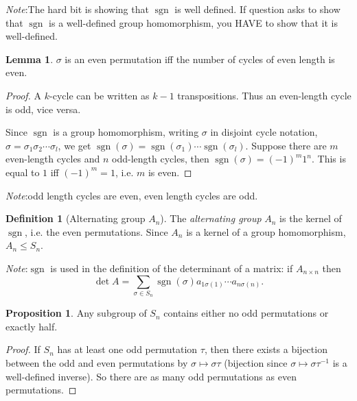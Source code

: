 \documentclass[a4paper]{article}
\theoremstyle{definition}
\newtheorem*{prop}{Proposition}
\newtheorem*{defi}{Definition}
\newtheorem*{lemma}{Lemma}
\newcommand{\note}{\noindent \emph{Note}:\;}
\DeclareMathOperator\sgn{sgn}
\begin{document}
\note The hard bit is showing that $\sgn$ is well defined. If question asks to show that $\sgn$ is a well-defined group homomorphism, you HAVE to show that it is well-defined.

\begin{lemma}
  $\sigma$ is an even permutation iff the number of cycles of even length is even.
\end{lemma}

\begin{proof}
  A $k$-cycle can be written as $k - 1$ transpositions. Thus an even-length cycle is odd, vice versa.

Since $\sgn$ is a group homomorphism, writing $\sigma$ in disjoint cycle notation, $\sigma = \sigma_1\sigma_2\cdots\sigma_l$, we get $\sgn(\sigma) = \sgn(\sigma_1)\cdots \sgn(\sigma_l)$. Suppose there are $m$ even-length cycles and $n$ odd-length cycles, then $\sgn(\sigma) = (-1)^m 1^n$. This is equal to $1$ iff $(-1)^m = 1$, i.e. $m$ is even. 
\end{proof}
\note odd length cycles are even, even length cycles are odd.

\begin{defi}[Alternating group $A_n$]
  The \emph{alternating group} $A_n$ is the kernel of $\sgn$, i.e. the even permutations.
  Since $A_n$ is a kernel of a group homomorphism, $A_n \leq S_n$.
\end{defi}
\note $\sgn$ is used in the definition of the determinant of a matrix: if $A_{n\times n}$ then
\[
\det A = \sum_{\sigma\in S_n}\sgn(\sigma) a_{1\sigma(1)}\cdots a_{n\sigma(n)}.
\]

\begin{prop}
  Any subgroup of $S_n$ contains either no odd permutations or exactly half.
\end{prop}

\begin{proof}
  If $S_n$ has at least one odd permutation $\tau$, then there exists a bijection between the odd and even permutations by $\sigma \mapsto \sigma\tau$ (bijection since $\sigma \mapsto \sigma \tau^{-1}$ is a well-defined inverse). So there are as many odd permutations as even permutations. 
\end{proof}
\end{document}
